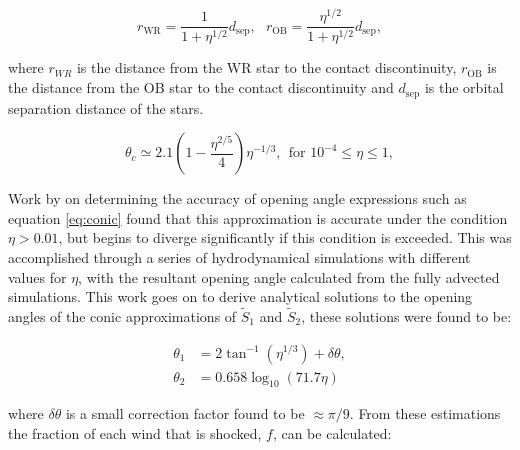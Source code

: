 \begin{equation}
  r_\text{WR} = \frac{1}{1+\eta^{1/2}} d_\text{sep} , ~~~ r_\text{OB} = \frac{\eta^{1/2}}{1+\eta^{1/2}} d_\text{sep} ,
\end{equation}

\noindent
where $r_{WR}$ is the distance from the WR star to the contact discontinuity, $r_\text{OB}$ is the distance from the OB star to the contact discontinuity and $d_\text{sep}$ is the orbital separation distance of the stars.



\begin{equation}
  \theta_c \simeq 2.1 \left(1 - \frac{\eta^{2/5}}{4}\right) \eta^{-1/3}, ~~ \text{for } 10^{-4} \leq \eta \leq 1, \label{eq:conic}
\end{equation}



Work by \textcite{pittardCollidingStellarWinds2018} on determining the accuracy of opening angle expressions such as equation \ref{eq:conic} found that this approximation is accurate under the condition $\eta > 0.01$, but begins to diverge significantly if this condition is exceeded.
This was accomplished through a series of hydrodynamical simulations with different values for $\eta$, with the resultant opening angle calculated from the fully advected simulations.
This work goes on to derive analytical solutions to the opening angles of the conic approximations of $\widetilde{S}_1$ and $\widetilde{S}_2$, these solutions were found to be:

\begin{subequations}
  \begin{align}
    \theta_1 & = 2 \tan^{-1} \left(\eta^{1/3}\right) + \delta \theta , \\
    \theta_2 & = 0.658 \log_{10} \left(71.7 \eta \right) 
  \end{align}
\end{subequations}

\noindent
where $\delta \theta$ is a small correction factor found to be $\approx \pi/9$.
From these estimations the fraction of each wind that is shocked, $f$, can be calculated:

